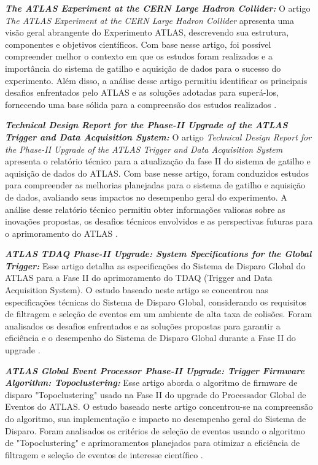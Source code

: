 \textit{\textbf{The ATLAS Experiment at the CERN Large Hadron Collider:}} O artigo \textit{The ATLAS Experiment at the CERN Large Hadron Collider} apresenta uma visão geral abrangente do Experimento ATLAS, descrevendo sua estrutura, componentes e objetivos científicos. Com base nesse artigo, foi possível compreender melhor o contexto em que os estudos foram realizados e a importância do sistema de gatilho e aquisição de dados para o sucesso do experimento. Além disso, a análise desse artigo permitiu identificar os principais desafios enfrentados pelo ATLAS e as soluções adotadas para superá-los, fornecendo uma base sólida para a compreensão dos estudos realizados \cite{The_ATLAS_Collaboration_2008}.

\textit{\textbf{Technical Design Report for the Phase-II Upgrade of the ATLAS Trigger  and Data Acquisition System:}} O artigo \textit{Technical Design Report for the Phase-II Upgrade of the ATLAS Trigger and Data Acquisition System} apresenta o relatório técnico para a atualização da fase II do sistema de gatilho e aquisição de dados do ATLAS. Com base nesse artigo, foram conduzidos estudos para compreender as melhorias planejadas para o sistema de gatilho e aquisição de dados, avaliando seus impactos no desempenho geral do experimento. A análise desse relatório técnico permitiu obter informações valiosas sobre as inovações propostas, os desafios técnicos envolvidos e as perspectivas futuras para o aprimoramento do ATLAS \cite{CERN_LHCC_2017}.

\textit{\textbf{ATLAS TDAQ Phase-II Upgrade: System Specifications for the Global Trigger:}} Esse artigo detalha as especificações do Sistema de Disparo Global do ATLAS para a Fase II do aprimoramento do TDAQ (Trigger and Data Acquisition System). O estudo baseado neste artigo se concentrou nas especificações técnicas do Sistema de Disparo Global, considerando os requisitos de filtragem e seleção de eventos em um ambiente de alta taxa de colisões. Foram analisados os desafios enfrentados e as soluções propostas para garantir a eficiência e o desempenho do Sistema de Disparo Global durante a Fase II do upgrade \cite{CERN_LHC_2022}.

\textit{\textbf{ATLAS Global Event Processor Phase-II Upgrade: Trigger Firmware Algorithm: Topoclustering:}} Esse artigo aborda o algoritmo de firmware de disparo "Topoclustering" usado na Fase II do upgrade do Processador Global de Eventos do ATLAS. O estudo baseado neste artigo concentrou-se na compreensão do algoritmo, sua implementação e impacto no desempenho geral do Sistema de Disparo. Foram analisados os critérios de seleção de eventos usando o algoritmo de "Topoclustering" e aprimoramentos planejados para otimizar a eficiência de filtragem e seleção de eventos de interesse científico \cite{CERN_LHC_2023}.




